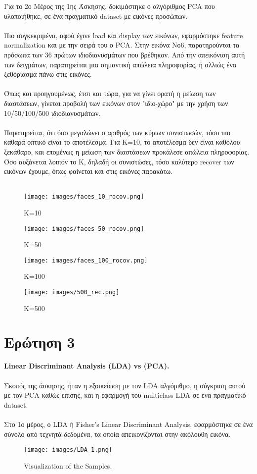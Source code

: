 \documentclass[12pt]{article}
\begin{document}
Για το 2ο Μέρος της 1ης Άσκησης, δοκιμάστηκε ο αλγόριθμος PCA που υλοποιήθηκε, σε ένα πραγματικό dataset με εικόνες προσώπων. \\\\
Πιο συγκεκριμένα, αφού έγινε load και display των εικόνων, εφαρμόστηκε feature normalization και με την σειρά του ο PCA. Στην εικόνα Νο6, παρατηρούνται τα πρόσωπα των 36 πρώτων ιδιοδιανυσμάτων που βρέθηκαν. Από την απεικόνιση αυτή των δειγμάτων, παρατηρείται μια σημαντική απώλεια πληροφορίας, ή αλλιώς ένα  ξεθόριασμα πάνω στις εικόνες.\\\\
Όπως και προηγουμένως, έτσι και τώρα, για να γίνει ορατή η μείωση των διαστάσεων, γίνεται προβολή των εικόνων στον "ιδιο-χώρο" με την χρήση των 10/50/100/500 ιδιοδιανυσμάτων.\\
\\ Παρατηρείται, ότι όσο μεγαλώνει ο αριθμός των κύριων συνιστωσών, τόσο πιο καθαρά οπτικό είναι το αποτέλεσμα. Για Κ=10, το αποτέλεσμα δεν είναι καθόλου ξεκάθαρο, και επομένως η μείωση των διαστάσεων προκάλεσε απώλεια πληροφορίας. Όσο αυξάνεται λοιπόν το Κ, δηλαδή οι συνιστώσες, τόσο καλύτερο recover των εικόνων έχουμε, όπως φαίνεται και στις εικόνες παρακάτω.\\\\

\begin{figure}[!h]
    \centering
    \texttt{[image: images/faces\_10\_rocov.png]}
    \caption{K=10}
    \label{fig:my_label}
\end{figure}
\begin{figure}[!h]
    \centering
    \texttt{[image: images/faces\_50\_rocov.png]}
    \caption{K=50}
    \label{fig:my_label}
\end{figure}
\begin{figure}[!h]
    \centering
    \texttt{[image: images/faces\_100\_rocov.png]}
    \caption{K=100}
    \label{fig:my_label}
\end{figure}
 \begin{figure}[!h]
    \centering
    \texttt{[image: images/500\_rec.png]}
    \caption{K=500}
    \label{fig:my_label}
 \end{figure}

\section*{Ερώτηση 3}
{\bfseries Linear Discriminant Analysis (LDA) vs (PCA).}\\ \\
Σκοπός της άσκησης, ήταν η εξοικείωση με τον LDA αλγόριθμο, η σύγκριση αυτού με τον PCA καθώς επίσης, και η εφαρμογή του multiclass LDA σε ενα πραγματικό dataset. \\ \\
Στο 1ο μέρος, ο LDA ή Fisher's Linear Discriminant Analysis, εφαρμόστηκε σε ένα σύνολο από τεχνητά δεδομένα, τα οποία απεικονίζονται στην ακόλουθη εικόνα.\\
\begin{figure}[!h]
    \centering
    \texttt{[image: images/LDA\_1.png]}
    \caption{Visualization of the Samples.}
    \label{fig:my_label}
\end{figure}
\end{document}
